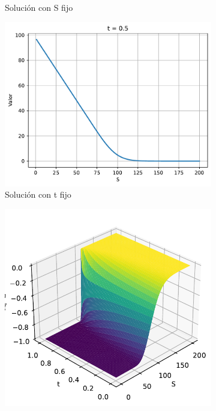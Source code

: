 \begin{figure}[H]
\begin{subfigure}[b]{0.3\linewidth}
        \caption{Solución con S fijo}
    \end{subfigure}
    \begin{subfigure}[b]{0.3\linewidth}
        \includegraphics[width=\linewidth]{Imagenes/Parte1/6_Sols/Put/PuttFIjo.pdf}
        \caption{Solución con t fijo}
    \end{subfigure}
    \begin{subfigure}[b]{0.3\linewidth}
        \includegraphics[width=\linewidth]{Imagenes/Parte1/6_Sols/Put/Put_Delta.pdf}

\end{subfigure}
\end{figure}
